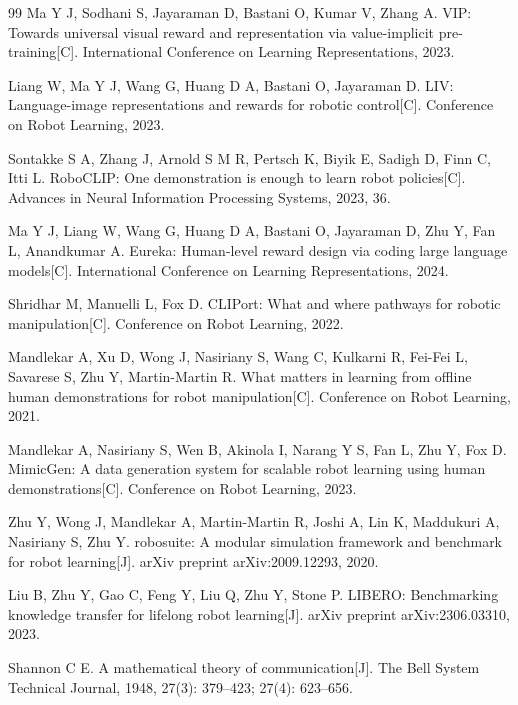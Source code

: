 \begin{thebibliography}{99}
    Ma Y J, Sodhani S, Jayaraman D, Bastani O, Kumar V, Zhang A.
    VIP: Towards universal visual reward and representation via value-implicit pre-training[C].
    International Conference on Learning Representations, 2023.
    
    Liang W, Ma Y J, Wang G, Huang D A, Bastani O, Jayaraman D.
    LIV: Language-image representations and rewards for robotic control[C].
    Conference on Robot Learning, 2023.
    
    Sontakke S A, Zhang J, Arnold S M R, Pertsch K, Biyik E, Sadigh D, Finn C, Itti L.
    RoboCLIP: One demonstration is enough to learn robot policies[C].
    Advances in Neural Information Processing Systems, 2023, 36.
    
    Ma Y J, Liang W, Wang G, Huang D A, Bastani O, Jayaraman D, Zhu Y, Fan L, Anandkumar A.
    Eureka: Human-level reward design via coding large language models[C].
    International Conference on Learning Representations, 2024.
    
    Shridhar M, Manuelli L, Fox D.
    CLIPort: What and where pathways for robotic manipulation[C].
    Conference on Robot Learning, 2022.
    
    Mandlekar A, Xu D, Wong J, Nasiriany S, Wang C, Kulkarni R, Fei-Fei L, Savarese S, Zhu Y, Martin-Martin R.
    What matters in learning from offline human demonstrations for robot manipulation[C].
    Conference on Robot Learning, 2021.
    
    Mandlekar A, Nasiriany S, Wen B, Akinola I, Narang Y S, Fan L, Zhu Y, Fox D.
    MimicGen: A data generation system for scalable robot learning using human demonstrations[C].
    Conference on Robot Learning, 2023.
    
    Zhu Y, Wong J, Mandlekar A, Martin-Martin R, Joshi A, Lin K, Maddukuri A, Nasiriany S, Zhu Y.
    robosuite: A modular simulation framework and benchmark for robot learning[J].
    arXiv preprint arXiv:2009.12293, 2020.
    
    Liu B, Zhu Y, Gao C, Feng Y, Liu Q, Zhu Y, Stone P.
    LIBERO: Benchmarking knowledge transfer for lifelong robot learning[J].
    arXiv preprint arXiv:2306.03310, 2023.

Shannon C E.
A mathematical theory of communication[J].
The Bell System Technical Journal, 1948, 27(3): 379--423; 27(4): 623--656.


\end{thebibliography}
